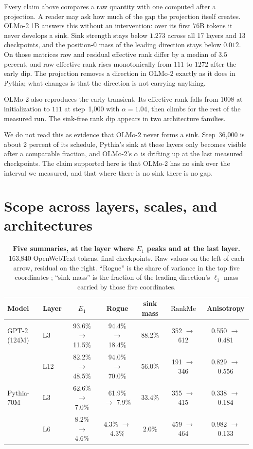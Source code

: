 \documentclass{article}
\theoremstyle{spaced}
\theoremstyle{definition}
\DeclareMathOperator{\RankMe}{RankMe}
\begin{document}
Every claim above compares a raw quantity with one computed after a projection. A reader may ask how much of the gap the projection itself creates. OLMo-2 1B answers this without an intervention: over its first 76B tokens it never develops a sink. Sink strength stays below $1.273$ across all 17 layers and 13 checkpoints, and the position-0 mass of the leading direction stays below $0.012$. On those matrices raw and residual effective rank differ by a median of $3.5$ percent, and raw effective rank rises monotonically from $111$ to $1272$ after the early dip. The projection removes a direction in OLMo-2 exactly as it does in Pythia; what changes is that the direction is not carrying anything.

OLMo-2 also reproduces the early transient. Its effective rank falls from $1008$ at initialization to $111$ at step~1{,}000 with $\alpha = 1.04$, then climbs for the rest of the measured run. The sink-free rank dip appears in two architecture families.

We do not read this as evidence that OLMo-2 never forms a sink. Step~36{,}000 is about 2 percent of its schedule, Pythia's sink at these layers only becomes visible after a comparable fraction, and OLMo-2's $\alpha$ is drifting up at the last measured checkpoints. The claim supported here is that OLMo-2 has no sink over the interval we measured, and that where there is no sink there is no gap.

\section{Scope across layers, scales, and architectures}
\label{sec:scope}

\begin{table}[t]
\centering
\caption{\textbf{Five summaries, at the layer where $E_1$ peaks and at the last layer.} 163{,}840 OpenWebText tokens, final checkpoints. Raw values on the left of each arrow, residual on the right. ``Rogue'' is the share of variance in the top five coordinates \citep{timkey2021all}; ``sink mass'' is the fraction of the leading direction's $\ell_1$ mass carried by those five coordinates.}
\label{tab:audit}
\small
\begin{tabular}{@{}llccccc@{}}
\toprule
\textbf{Model} & \textbf{Layer} & $E_1$ & \textbf{Rogue} & \textbf{sink mass} & $\RankMe$ & \textbf{Anisotropy} \\
\midrule
GPT-2 (124M)     & L3 & 93.6\% $\to$ 11.5\% & 94.4\% $\to$ 18.4\% & 88.2\% & 352 $\to$ 612 & 0.550 $\to$ 0.481 \\
                 & L12& 82.2\% $\to$ 48.5\% & 94.0\% $\to$ 70.0\% & 56.0\% & 191 $\to$ 346 & 0.829 $\to$ 0.556 \\
\midrule
Pythia-70M       & L3 & 62.6\% $\to$ 7.0\%  & 61.9\% $\to$ 7.9\%  & 33.4\% & 355 $\to$ 415 & 0.338 $\to$ 0.184 \\
                 & L6 & 8.2\%  $\to$ 4.6\%  & 4.3\%  $\to$ 4.3\%  & 2.0\%  & 459 $\to$ 464 & 0.982 $\to$ 0.133 \\
\bottomrule
\end{tabular}
\end{table}
\end{document}
